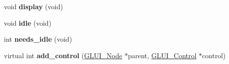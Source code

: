 \begin{DoxyCompactItemize}
\item 
\hypertarget{class_g_l_u_i___main_af8867df3fa133efbf11064da84a8c047}{void {\bfseries display} (void)}\label{class_g_l_u_i___main_af8867df3fa133efbf11064da84a8c047}

\item 
\hypertarget{class_g_l_u_i___main_a0f172148e78cde1d8e25e989ba90d43d}{void {\bfseries idle} (void)}\label{class_g_l_u_i___main_a0f172148e78cde1d8e25e989ba90d43d}

\item 
\hypertarget{class_g_l_u_i___main_aef95c5469e82e69335293fecbebdd3ab}{int {\bfseries needs\+\_\+idle} (void)}\label{class_g_l_u_i___main_aef95c5469e82e69335293fecbebdd3ab}

\item 
\hypertarget{class_g_l_u_i___main_a63be4fb40e0ef3fe20f833ea38df2ecb}{virtual int {\bfseries add\+\_\+control} (\hyperlink{class_g_l_u_i___node}{G\+L\+U\+I\+\_\+\+Node} $\ast$parent, \hyperlink{class_g_l_u_i___control}{G\+L\+U\+I\+\_\+\+Control} $\ast$control)}\label{class_g_l_u_i___main_a63be4fb40e0ef3fe20f833ea38df2ecb}

\end{DoxyCompactItemize}
